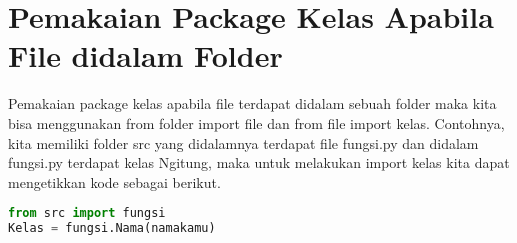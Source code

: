 \section{Pemakaian Package Kelas Apabila File didalam Folder}
Pemakaian package kelas apabila ﬁle terdapat didalam sebuah folder maka kita bisa menggunakan from folder import ﬁle dan from ﬁle import kelas. Contohnya, kita memiliki folder src yang didalamnya terdapat ﬁle fungsi.py dan didalam fungsi.py terdapat kelas Ngitung, maka untuk melakukan import kelas kita dapat mengetikkan kode sebagai berikut.
\begin{lstlisting}[language=Python]
from src import fungsi 
Kelas = fungsi.Nama(namakamu)
\end{lstlisting}